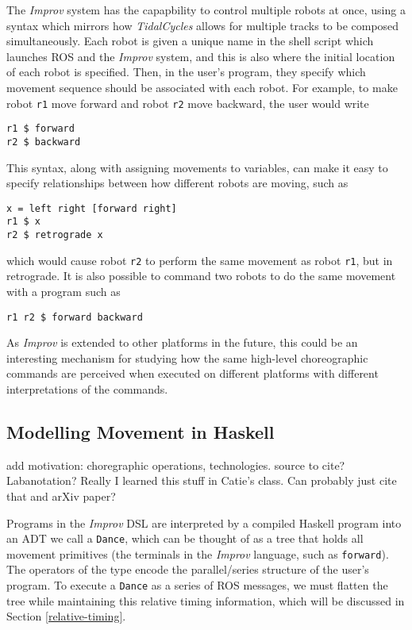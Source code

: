 \documentclass[sigconf]{acmart}
\begin{document}
The \emph{Improv} system has the capapbility to control multiple robots
at once, using a syntax which mirrors how \emph{TidalCycles} allows for
multiple tracks to be composed simultaneously. Each robot is given a
unique name in the shell script which launches ROS and the \emph{Improv}
system, and this is also where the initial location of each robot is
specified. Then, in the user's program, they specify which movement
sequence should be associated with each robot. For example, to make
robot \texttt{r1} move forward and robot \texttt{r2} move backward, the
user would write

\begin{verbatim}
r1 $ forward
r2 $ backward
\end{verbatim}

This syntax, along with assigning movements to variables, can make it easy to
specify relationships between how different robots are moving, such as

\begin{verbatim}
x = left right [forward right]
r1 $ x
r2 $ retrograde x
\end{verbatim}


which would cause robot \texttt{r2} to perform the same movement as
robot \texttt{r1}, but in retrograde. It is also possible to command two robots
to do the same movement with a program such as

\begin{verbatim}
r1 r2 $ forward backward
\end{verbatim}

As \emph{Improv} is extended to other platforms in the future, this could be an
interesting mechanism for studying how the same high-level choreographic
commands are perceived when executed on different platforms with different
interpretations of the commands.

\subsection{Modelling Movement in
Haskell}\label{modelling-movement-in-haskell}

{\color{red}add motivation: choregraphic operations, technologies. source to
cite? Labanotation? Really I learned this stuff in Catie's class. Can probably
just cite that and arXiv paper?}

Programs in the \emph{Improv} DSL are interpreted by a compiled Haskell
program into an ADT we call a \texttt{Dance}, which can be thought of as
a tree that holds all movement primitives (the terminals in the
\emph{Improv} language, such as \texttt{forward}). The operators of the
type encode the parallel/series structure of the user's program. To
execute a \texttt{Dance} as a series of ROS messages, we must flatten
the tree while maintaining this relative timing information, which will
be discussed in Section \ref{relative-timing}.
\end{document}
